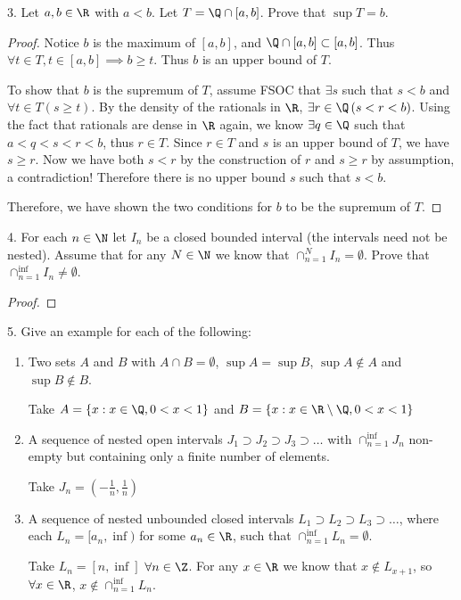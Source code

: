 3. Let $a, b \in \R$ with $a < b$. Let $T = \Q \cap [a, b]$. Prove that $\sup T = b$.

\begin{proof}
	Notice $b$ is the maximum of $[a, b]$, and $\Q \cap [a, b] \subset [a, b]$. Thus $\forall t \in T, t \in [a, b] \implies b \ge t$. Thus $b$ is an upper bound of $T$.

	To show that $b$ is the supremum of $T$, assume FSOC that $\exists s$ such that $s < b$ and $\forall t \in T \left(s \ge  t \right)$. By the density of the rationals in $ \R$, $\exists r \in \Q \left( s < r < b \right)$. Using the fact that rationals are dense in  $\R$ again, we know $\exists q \in \Q$ such that $a < q < s < r < b$, thus $r \in T$. Since $r \in T$ and $s$ is an upper bound of $T$, we have $s \ge r$. Now we have both $s < r$ by the construction of $r$ and $s \ge r$ by assumption, a contradiction! Therefore there is no upper bound $s$ such that $s < b$.

	Therefore, we have shown the two conditions for $b$ to be the supremum of $T$. 
\end{proof}





4. For each $n \in \N$ let $I_n$ be a closed bounded interval (the intervals need not be nested). Assume that for any $N \in \N$ we know that $\cap_{n=1}^{N}I_n = \emptyset$. Prove that $\cap_{n=1}^{\inf}I_n \neq \emptyset$.

\begin{proof}
	
\end{proof}





5. Give an example for each of the following: 
\begin{enumerate}
	\item Two sets $A$ and $B$ with $A \cap B = \emptyset$, $\sup A = \sup B$, $\sup A \not\in A$ and $\sup B \not\in B$.

		Take $A = \{x : x \in \Q, 0 < x < 1\}$  and  $B = \{x : x \in \R \setminus \Q, 0 < x < 1\} $	
	\item A sequence of nested open intervals $J_1 \supset J_2 \supset J_3 \supset \ldots$ with $\cap_{n=1}^{\inf}J_n$ non-empty but containing only a finite number of elements.

		Take $J_n = (-\frac{1}{n}, \frac{1}{n})$
	\item A sequence of nested unbounded closed intervals $L_1 \supset L_2 \supset L_3 \supset \ldots$, where each $L_n = [a_n, \inf)$ for some $a_n \in \R$, such that $\cap_{n=1}^{\inf}L_n = \emptyset$. 

		Take $L_n = [n, \inf]$ $\forall n \in \Z$. For any $x \in \R$ we know that $x \not\in L_{x + 1}$, so $\forall x \in \R$, $x \not\in \cap_{n=1}^{\inf} L_n$.
\end{enumerate}




